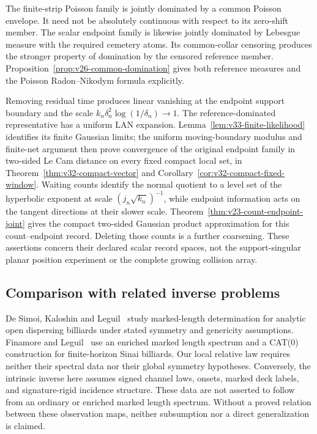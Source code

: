 The finite-strip Poisson family is jointly dominated by a common Poisson
envelope.  It need not be absolutely continuous with respect to its
zero-shift member.  The scalar endpoint family is likewise jointly dominated
by Lebesgue measure with the required cemetery atoms.  Its common-collar
censoring produces the stronger property of domination by the censored
reference member.  Proposition~\ref{prop:v26-common-domination} gives both
reference measures and the Poisson Radon--Nikodym formula explicitly.

Removing residual time produces linear vanishing at the endpoint support
boundary and the scale \(k_n\delta_n^2\log(1/\delta_n)\to1\).
The reference-dominated representative has a uniform LAN expansion.
Lemma~\ref{lem:v33-finite-likelihood} identifies its finite Gaussian limits;
the uniform moving-boundary modulus and finite-net argument then prove
convergence of the original endpoint family in two-sided Le Cam distance
on every fixed compact local set, in Theorem~\ref{thm:v32-compact-vector}
and Corollary~\ref{cor:v32-compact-fixed-window}.
Waiting counts identify the normal quotient to a level set of the
hyperbolic exponent at scale \((j_n\sqrt{k_n})^{-1}\), while endpoint
information acts on the tangent directions at their slower scale.
Theorem~\ref{thm:v23-count-endpoint-joint} gives the compact two-sided
Gaussian product approximation for this count--endpoint record.
Deleting those counts is a further coarsening.  These assertions concern
their declared scalar record spaces, not the support-singular planar
position experiment or the complete growing collision array.

\subsection{Comparison with related inverse problems}

De Simoi, Kaloshin and Leguil~\cite{DSKL} study marked-length determination
for analytic open dispersing billiards under stated symmetry and genericity
assumptions.  Finamore and Leguil~\cite{FinamoreLeguil} use an enriched
marked length spectrum and a CAT(0) construction for finite-horizon Sinai
billiards.  Our local relative law requires neither their spectral data nor
their global symmetry hypotheses.  Conversely, the intrinsic inverse here
assumes signed channel laws, onsets, marked deck labels, and signature-rigid
incidence structure.  These data are not asserted to follow from an ordinary
or enriched marked length spectrum.  Without a proved relation between
these observation maps, neither subsumption nor a direct generalization
is claimed.


